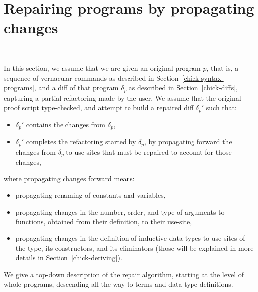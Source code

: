 \section{Repairing programs by propagating changes}~\label{chick-repair}

In this section, we assume that we are given an original program $p$, that is, a
sequence of vernacular commands as described in
Section~\ref{chick-syntax-programs}, and a diff of that program $\delta_p$ as
described in Section~\ref{chick-diffs}, capturing a partial refactoring made by
the user.  We assume that the original proof script type-checked, and attempt to
build a repaired diff $\delta_p'$ such that:

\begin{itemize}

\item $\delta_p'$ contains the changes from $\delta_p$,

\item $\delta_p'$ completes the refactoring started by $\delta_p$, by
propagating forward the changes from $\delta_p$ to use-sites that must be
repaired to account for those changes,

\end{itemize}
%
where propagating changes forward means:

\begin{itemize}

\item propagating renaming of constants and variables,

\item propagating changes in the number, order, and type of arguments to
functions, obtained from their definition, to their use-site,

\item propagating changes in the definition of inductive data types to use-sites
of the type, its constructors, and its eliminators (those will be explained in
more details in Section~\ref{chick-deriving}).

\end{itemize}

We give a top-down description of the repair algorithm, starting at the level of
whole programs, descending all the way to terms and data type definitions.








